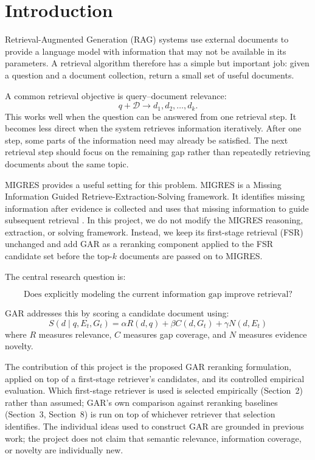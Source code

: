 \documentclass[11pt,a4paper]{article}
\begin{document}
\section{Introduction}

Retrieval-Augmented Generation (RAG) systems use external documents to provide a language model with information that may not be available in its parameters. A retrieval algorithm therefore has a simple but important job: given a question and a document collection, return a small set of useful documents.

A common retrieval objective is query--document relevance:
\[
q+\mathcal{D} \longrightarrow d_1,d_2,\ldots,d_k.
\]
This works well when the question can be answered from one retrieval step. It becomes less direct when the system retrieves information iteratively. After one step, some parts of the information need may already be satisfied. The next retrieval step should focus on the remaining gap rather than repeatedly retrieving documents about the same topic.

MIGRES provides a useful setting for this problem. MIGRES is a Missing Information Guided Retrieve-Extraction-Solving framework. It identifies missing information after evidence is collected and uses that missing information to guide subsequent retrieval \citep{wang-etal-2025-llms}. In this project, we do not modify the MIGRES reasoning, extraction, or solving framework. Instead, we keep its first-stage retrieval (FSR) unchanged and add GAR as a reranking component applied to the FSR candidate set before the top-$k$ documents are passed on to MIGRES.

The central research question is:

\[
\boxed{\text{Does explicitly modeling the current information gap improve retrieval?}}
\]

GAR addresses this by scoring a candidate document using:
\[
\boxed{
S(d\mid q,E_t,G_t)
=
\alpha R(d,q)
+
\beta C(d,G_t)
+
\gamma N(d,E_t)
}
\]
where $R$ measures relevance, $C$ measures gap coverage, and $N$ measures evidence novelty.

The contribution of this project is the proposed GAR reranking formulation, applied on top of a first-stage retriever's candidates, and its controlled empirical evaluation. Which first-stage retriever is used is selected empirically (Section~2) rather than assumed; GAR's own comparison against reranking baselines (Section~3, Section~8) is run on top of whichever retriever that selection identifies. The individual ideas used to construct GAR are grounded in previous work; the project does not claim that semantic relevance, information coverage, or novelty are individually new.
\end{document}
